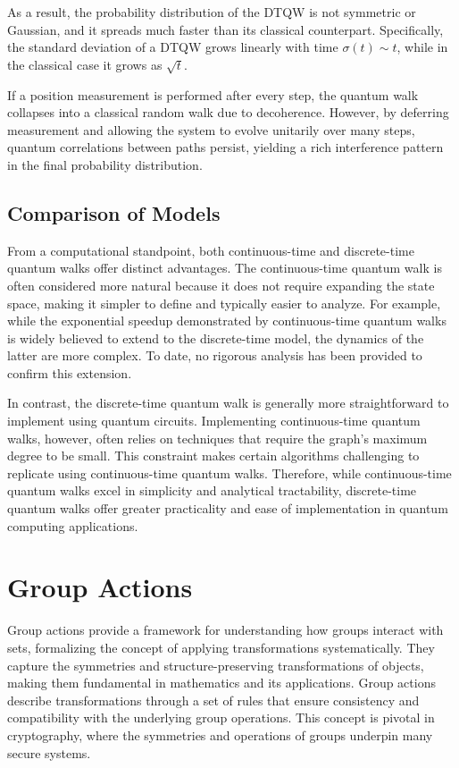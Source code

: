 \documentclass[11pt]{article}
\theoremstyle{definition}
\begin{document}
As a result, the probability distribution of the DTQW is not symmetric or Gaussian, and it spreads much faster than its classical counterpart. Specifically, the standard deviation of a DTQW grows linearly with time \( \sigma(t) \sim t \), while in the classical case it grows as \( \sqrt{t} \).


If a position measurement is performed after every step, the quantum walk collapses into a classical random walk due to decoherence. However, by deferring measurement and allowing the system to evolve unitarily over many steps, quantum correlations between paths persist, yielding a rich interference pattern in the final probability distribution.


\subsection*{Comparison of Models}

From a computational standpoint, both continuous-time and discrete-time quantum walks offer distinct advantages. The continuous-time quantum walk is often considered more natural because it does not require expanding the state space, making it simpler to define and typically easier to analyze. For example, while the exponential speedup demonstrated by continuous-time quantum walks is widely believed to extend to the discrete-time model, the dynamics of the latter are more complex. To date, no rigorous analysis has been provided to confirm this extension.

In contrast, the discrete-time quantum walk is generally more straightforward to implement using quantum circuits. Implementing continuous-time quantum walks, however, often relies on techniques that require the graph's maximum degree to be small. This constraint makes certain algorithms challenging to replicate using continuous-time quantum walks. Therefore, while continuous-time quantum walks excel in simplicity and analytical tractability, discrete-time quantum walks offer greater practicality and ease of implementation in quantum computing applications.






\section{Group Actions}


Group actions provide a framework for understanding how groups interact with sets, formalizing the concept of applying transformations systematically. They capture the symmetries and structure-preserving transformations of objects, making them fundamental in mathematics and its applications. Group actions describe transformations through a set of rules that ensure consistency and compatibility with the underlying group operations. This concept is pivotal in cryptography, where the symmetries and operations of groups underpin many secure systems.
\end{document}
